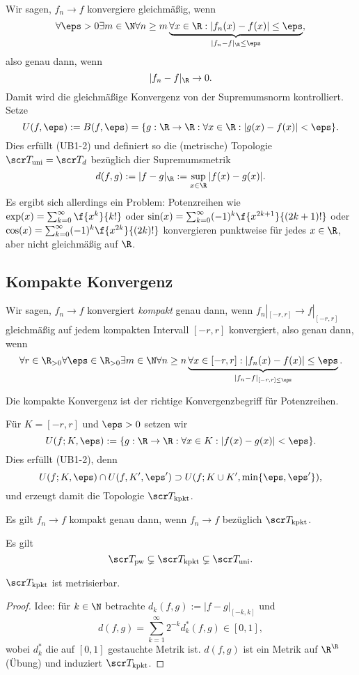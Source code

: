 Wir sagen, $f_n \to f$ konvergiere gleichmäßig, wenn
\[
	\forall \eps > 0 \exists m \in \N \forall n \ge m \underbrace{\forall x \in \R : |f_n(x) - f(x) | \le \eps}_{|f_n - f|_{\R} \le \eps},
\]
also genau dann, wenn
\[
	|f_n-f|_{\R} \to 0.
\]
Damit wird die gleichmäßige Konvergenz von der Supremumsnorm kontrolliert.
Setze
\[
	U(f,\eps)
	:= B(f,\eps)
	= \{ g : \R \to \R : \forall x \in \R : |g(x) - f(x)| < \eps \}.
\]
Dies erfüllt (UB1-2) und definiert so die (metrische) Topologie $\scr T_{\text{uni}} = \scr T_d$ bezüglich dier Supremumsmetrik
\[
	d(f,g)
	:= |f-g|_{\R}
	:= \sup_{x\in\R} |f(x) - g(x)|.
\]
Es ergibt sich allerdings ein Problem:
Potenzreihen wie $\exp(x) = \sum_{k=0}^\infty \f {x^k}{k!}$ oder $\sin(x) = \sum_{k=0}^\infty (-1)^k \f {x^{2k+1}}{(2k+1)!}$ oder $\cos (x) = \sum_{k=0}^\infty (-1)^k \f {x^{2k}}{(2k)!}$ konvergieren punktweise für jedes $x \in \R$, aber nicht gleichmäßig auf $\R$.

\subsection{Kompakte Konvergenz}

Wir sagen, $f_n \to f$ konvergiert \emph{kompakt} genau dann, wenn $f_n|_{[-r,r]} \to f|_{[-r,r]}$ gleichmäßig auf jedem kompakten Intervall $[-r,r]$ konvergiert, also genau dann, wenn
\[
	\forall r \in \R_{>0} \forall \eps \in \R_{>0} \exists m \in \N \forall n \ge n \underbrace{\forall x \in [-r,r] : |f_n(x) - f(x)| \le \eps}_{|f_n-f|_{[-r,r]\le \eps}}.
\]
\begin{ex}
	Die kompakte Konvergenz ist der richtige Konvergenzbegriff für Potenzreihen.
\end{ex}
Für $K = [-r,r]$ und $\eps > 0$ setzen wir
\[
	U(f; K, \eps)
	:= \{ g: \R \to \R : \forall x \in K : |f(x) - g(x)| < \eps \}.
\]
Dies erfüllt (UB1-2), denn
\[
	U(f;K,\eps) \cap U(f,K',\eps')
	\supset U(f; K \cup K', \min\{\eps, \eps'\}),
\]
und erzeugt damit die Topologie $\scr T_{\text{kpkt}}$.

\begin{st}
	Es gilt $f_n \to f$ kompakt genau dann, wenn $f_n \to f$ bezüglich $\scr T_{\text{kpkt}}$.
\end{st}

\begin{nt}
	Es gilt
	\[
		\scr T_{\text{pw}} \subsetneq \scr T_{\text{kpkt}} \subsetneq \scr T_{\text{uni}}.
	\]
\end{nt}

\begin{st}
	$\scr T_{\text{kpkt}}$ ist metrisierbar.
	\begin{proof}
		Idee: für $k \in \N$ betrachte $d_k(f,g) := |f-g|_{[-k,k]}$ und
		\[
			d(f,g) = \sum_{k=1}^\infty 2^{-k} d_k^* (f,g) \in [0,1],
		\]
		wobei $d_k^*$ die auf $[0,1]$ gestauchte Metrik ist.
		$d(f,g)$ ist ein Metrik auf $\R^\R$ (Übung) und induziert $\scr T_{\text{kpkt}}$.
	\end{proof}
\end{st}


